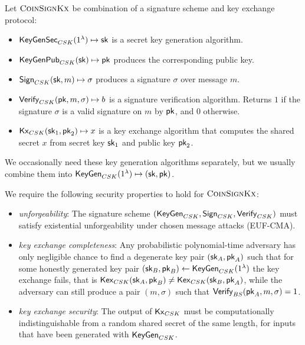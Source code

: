 Let $\textsc{CoinSignKx}$ be combination of a signature scheme and key exchange protocol:

\begin{itemize}
  \item $\mathsf{KeyGenSec}_{CSK}(1^\lambda) \mapsto \mathsf{sk}$ is a secret key generation algorithm.
  \item $\mathsf{KeyGenPub}_{CSK}(\mathsf{sk}) \mapsto \mathsf{pk}$ produces the corresponding public key.
  \item $\mathsf{Sign}_{CSK}(\mathsf{sk}, m) \mapsto \sigma$ produces a signature $\sigma$ over message $m$.
  \item $\mathsf{Verify}_{CSK}(\mathsf{pk}, m, \sigma) \mapsto b$ is a signature verification algorithm.
    Returns $1$ if the signature $\sigma$ is a valid signature on $m$ by $\mathsf{pk}$, and $0$ otherwise.
  \item $\mathsf{Kx}_{CSK}(\mathsf{sk}_1, \mathsf{pk}_2) \mapsto x$ is a key exchange algorithm that computes
    the shared secret $x$ from secret key $\mathsf{sk}_1$ and public key $\mathsf{pk}_2$.
\end{itemize}

We occasionally need these key generation algorithms separately, but
we usually combine them into $\mathsf{KeyGen}_{CSK}(1^\lambda) \mapsto (\mathsf{sk}, \mathsf{pk})$.

We require the following security properties to hold for $\textsc{CoinSignKx}$:
\begin{itemize}
  \item \emph{unforgeability}:  The signature scheme $(\mathsf{KeyGen}_{CSK}, \mathsf{Sign}_{CSK}, \mathsf{Verify}_{CSK})$
    must satisfy existential unforgeability under chosen message attacks (EUF-CMA).

  \item \emph{key exchange completeness}:
    Any probabilistic polynomial-time adversary has only negligible chance to find
    a degenerate key pair $(\mathsf{sk}_A, \mathsf{pk}_A)$ such that for some
    honestly generated key pair 
    $(\mathsf{sk}_B, \mathsf{pk}_B) \leftarrow \mathsf{KeyGen}_{CSK}(1^\lambda)$
    the key exchange fails, that is
      $\mathsf{Kex}_{CSK}(\mathsf{sk}_A, \mathsf{pk}_B) \neq \mathsf{Kex}_{CSK}(\mathsf{sk}_B, \mathsf{pk}_A)$,
    while the adversary can still produce a pair $(m, \sigma)$ such that $\mathsf{Verify}_{BS}(\mathsf{pk}_A, m, \sigma) = 1$.

  \item \emph{key exchange security}:  The output of $\mathsf{Kx}_{CSK}$ must be computationally
    indistinguishable from a random shared secret of the same length, for inputs that have been
    generated with $\mathsf{KeyGen}_{CSK}$.
\end{itemize}

